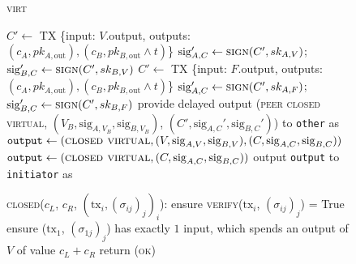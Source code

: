 \begin{figure}[H]
\begin{processbox}{\textsc{virt}}
\begin{algorithmic}[1]
              \State {}
              \State $C' \gets$ TX \{input: $V$.output, outputs: $(c_A, pk_{A,
              \mathrm{out}}), (c_B, pk_{B, \mathrm{out}} \wedge t)$\}
              \State $\mathrm{sig}_{A, C}' \gets \textsc{sign}(C', sk_{A, V})$;
              $\mathrm{sig}_{B, C}' \gets \textsc{sign}(C', sk_{B, V})$
            \Else \: 
              \State $C' \gets$ TX \{input: $F$.output, outputs: $(c_A, pk_{A,
              \mathrm{out}}), (c_B, pk_{B, \mathrm{out}} \wedge t)$\}
              \State $\mathrm{sig}_{A, C}' \gets \textsc{sign}(C', sk_{A, F})$;
              $\mathrm{sig}_{B, C}' \gets \textsc{sign}(C', sk_{B, F})$
            \EndIf
            \State provide delayed output (\textsc{peer closed virtual}, $(V_B,
            \mathrm{sig}_{A, V_B}, \mathrm{sig}_{B, V_B})$, $(C',
            \mathrm{sig}_{A, C}', \mathrm{sig}_{B, C}')$) to \texttt{other} as
            \bob
          \EndIf
            \State $\mathtt{output} \gets (\textsc{closed virtual}, (V,
            \mathrm{sig}_{A, V}, \mathrm{sig}_{B, V}), (C, \mathrm{sig}_{A, C},
            \mathrm{sig}_{B, C}))$
          \Else
            \State $\mathtt{output} \gets (\textsc{closed virtual}, (C,
            \mathrm{sig}_{A, C}, \mathrm{sig}_{B, C}))$
          \EndIf
          \State output \texttt{output} to \texttt{initiator} as \alice
        \EndIf
        \Statex

        \State \textsc{closed}($c_L$, $c_R$, $(\mathrm{tx}_i,
        (\sigma_{ij})_j)_i$):
        \Indent
            \State ensure \textsc{verify}($\mathrm{tx}_i$, $(\sigma_{ij})_j$) =
            True
          \EndFor
          \State ensure ($\mathrm{tx}_1$, $(\sigma_{1j})_j$) has exactly $1$
          input, which spends an output of $V$ of value $c_L + c_R$
          \State return (\textsc{ok})
        \EndIndent
    \end{algorithmic}
  \end{processbox}
  \caption{}
  \label{code:virtual-layer}
\end{figure}
